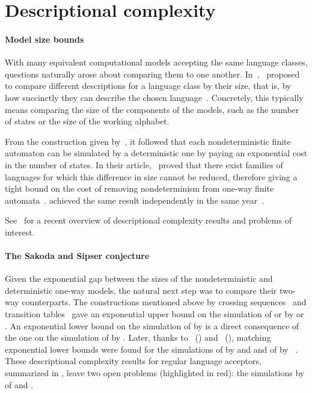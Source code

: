 \section{Descriptional complexity}\label{sec:context-descrcomp}

\paragraph{Model size bounds} With many equivalent computational models accepting the same language classes, questions naturally arose about comparing them to one another.
In~\citeyear{MeyFis71},~\citeauthor{MeyFis71} proposed to compare different descriptions for a language class by their size, that is, by how succinctly they can describe the chosen language~\cite{MeyFis71}.
Concretely, this typically means comparing the size of the components of the models, such as the number of states or the size of the working alphabet.

From the construction given by~\citeauthor{RabSco59}, it followed that each nondeterministic finite automaton can be simulated by a deterministic one by paying an exponential cost in the number of states.
In their article,~\citeauthor{MeyFis71} proved that there exist families of languages for which this difference in size cannot be reduced, therefore giving a tight bound on the cost of removing nondeterminism from one-way finite automata~\cite{MeyFis71}.
\citeauthor{Moo71} achieved the same result independently in the same year~\cite{Moo71}.

See~\cite{KutMor+21} for a recent overview of descriptional complexity results and problems of interest.

\paragraph{The Sakoda and Sipser conjecture} Given the exponential gap between the sizes of the nondeterministic and deterministic one-way models, the natural next step was to compare their two-way counterparts.
The constructions mentioned above by crossing sequences~\cite{RabSco59} and transition tables~\cite{She59} gave an exponential upper bound on the simulation of \TNFAs or \TDFAs by \ONFAs or \ODFAs.
An exponential lower bound on the simulation of \TNFAs by \ODFAs is a direct consequence of the one on the simulation of \ONFAs by \ODFAs.
Later, thanks to~\citeauthor{Bir93} (\citeyear{Bir93}) and~\citeauthor{Kap05} (\citeyear{Kap05}), matching exponential lower bounds were found for the simulations of \TDFAs by \ONFAs and \ODFAs and of \TNFAs by \ONFAs~\cite{Bir93,Kap05}.
These descriptional complexity results for regular language acceptors, summarized in , leave two open problems (highlighted in red): the simulations by \TDFAs of \TNFAs and \ONFAs.

